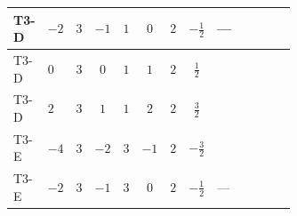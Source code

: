 \documentclass[8pt]{article}
\begin{document}
\begin{landscape}
\begin{longtable}{@{}llcccccc >{\raggedright\arraybackslash}p{0.21\linewidth} >{\raggedright\arraybackslash}p{0.21\linewidth} >{\raggedright\arraybackslash}p{0.21\linewidth}@{}}
\midrule
T3-D & $-2$ & $3$ & $-1$ & $1$ & $0$ & $2$ & $-\frac{1}{2}$ & --- & \scriptsize\adjustbox{max width=\linewidth}{$\begin{gathered} +6 {\lambda_{12}^{(1)}}^2\end{gathered}$} & \scriptsize\adjustbox{max width=\linewidth}{$\begin{gathered} +4 {\lambda_{HS_2}^{(1)}}^2\end{gathered}$} \\
\midrule
T3-D & $0$ & $3$ & $0$ & $1$ & $1$ & $2$ & $\frac{1}{2}$ & \scriptsize\adjustbox{max width=\linewidth}{$\begin{gathered} +12 {g_1}^4\end{gathered}$} & \scriptsize\adjustbox{max width=\linewidth}{$\begin{gathered} +6 {\lambda_{12}^{(1)}}^2\end{gathered}$} & \scriptsize\adjustbox{max width=\linewidth}{$\begin{gathered} +4 {\lambda_{HS_2}^{(1)}}^2\end{gathered}$} \\
\midrule
T3-D & $2$ & $3$ & $1$ & $1$ & $2$ & $2$ & $\frac{3}{2}$ & \scriptsize\adjustbox{max width=\linewidth}{$\begin{gathered} +192 {g_1}^4\end{gathered}$} & \scriptsize\adjustbox{max width=\linewidth}{$\begin{gathered} +6 {\lambda_{12}^{(1)}}^2\end{gathered}$} & \scriptsize\adjustbox{max width=\linewidth}{$\begin{gathered} +4 {\lambda_{HS_2}^{(1)}}^2\end{gathered}$} \\
\midrule
T3-E & $-4$ & $3$ & $-2$ & $3$ & $-1$ & $2$ & $-\frac{3}{2}$ & \scriptsize\adjustbox{max width=\linewidth}{$\begin{gathered} +12 {g_1}^4\end{gathered}$} & \scriptsize\adjustbox{max width=\linewidth}{$\begin{gathered} +6 {\lambda_{12}^{(1)}}^2\end{gathered}$} & \scriptsize\adjustbox{max width=\linewidth}{$\begin{gathered} +4 {\lambda_{HS_2}^{(1)}}^2\end{gathered}$} \\
\midrule
T3-E & $-2$ & $3$ & $-1$ & $3$ & $0$ & $2$ & $-\frac{1}{2}$ & --- & \scriptsize\adjustbox{max width=\linewidth}{$\begin{gathered} +6 {\lambda_{12}^{(1)}}^2\end{gathered}$} & \scriptsize\adjustbox{max width=\linewidth}{$\begin{gathered} +4 {\lambda_{HS_2}^{(1)}}^2\end{gathered}$} \\

\end{longtable}
\end{landscape}
\end{document}
